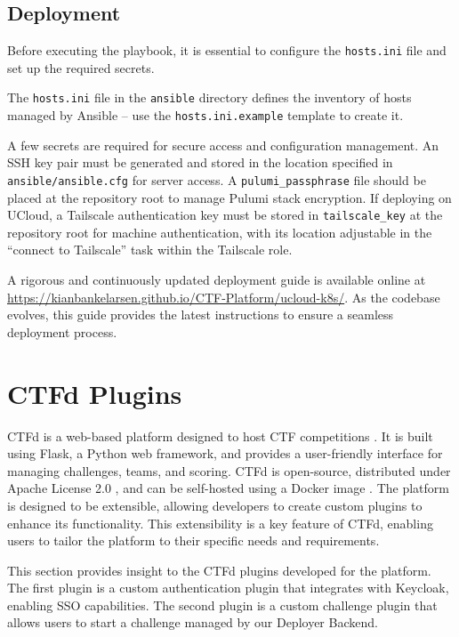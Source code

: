 \subsection{Deployment}

Before executing the playbook, it is essential to configure the \texttt{hosts.ini} file and set up the required secrets.

The \texttt{hosts.ini} file in the \texttt{ansible} directory defines the inventory of hosts managed by Ansible -- use the \texttt{hosts.ini.example} template to create it.

A few secrets are required for secure access and configuration management. An SSH key pair must be generated and stored in the location specified in \texttt{ansible/ansible.cfg} for server access. A \texttt{pulumi\_passphrase} file should be placed at the repository root to manage Pulumi stack encryption. If deploying on UCloud, a Tailscale authentication key must be stored in \texttt{tailscale\_key} at the repository root for machine authentication, with its location adjustable in the ``connect to Tailscale'' task within the Tailscale role.

A rigorous and continuously updated deployment guide is available online at \url{https://kianbankelarsen.github.io/CTF-Platform/ucloud-k8s/}. As the codebase evolves, this guide provides the latest instructions to ensure a seamless deployment process.

\section{CTFd Plugins}
CTFd is a web-based platform designed to host CTF competitions \Parencite{ctfd_github}. It is built using Flask, a Python web framework, and provides a user-friendly interface for managing challenges, teams, and scoring. CTFd is open-source, distributed under Apache License 2.0 \Parencite{ctfd_github}, and can be self-hosted using a Docker image \Parencite{ctfd_docker}. The platform is designed to be extensible, allowing developers to create custom plugins to enhance its functionality. This extensibility is a key feature of CTFd, enabling users to tailor the platform to their specific needs and requirements. 

This section provides insight to the CTFd plugins developed for the platform. The first plugin is a custom authentication plugin that integrates with Keycloak, enabling SSO capabilities. The second plugin is a custom challenge plugin that allows users to start a challenge managed by our Deployer Backend. 

